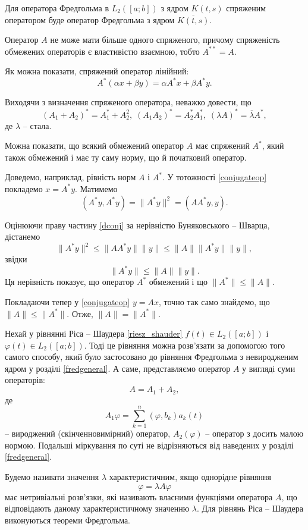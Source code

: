 \documentclass[14pt,twoside]{extreport}
\theoremstyle{mystyle}
\numberwithin{equation}{chapter}
\begin{document}
Для оператора Фредгольма в $L_2([a; b])$ з ядром $K(t, s)$ спряженим оператором буде оператор Фредгольма з ядром $\overline{K(t, s)}$.

Оператор $A$ не може мати більше одного спряженого, причому спряженість обмежених операторів є властивістю взаємною, тобто $A^{**} = A$.

Як можна показати, спряжений оператор лінійний:
\[
A^{*}(\alpha x + \beta y) = \alpha A^{*}x + \beta A^{*} y.
\]

Виходячи з визначення спряженого оператора, неважко довести, що
\[
(A_1 + A_2)^{*} = A_1^{*} + A_2^{2}, \; (A_1A_2)^{*} = A_2^{*}A_1^{*}, \; (\lambda A)^{*} = \overline{\lambda} A^{*},
\]
де $\lambda$ -- стала.

Можна показати, що всякий обмежений оператор $A$ має спряжений $A^{*}$, який також обмежений і має ту саму норму, що й початковий оператор.

Доведемо, наприклад, рівність норм $A$ і $A^{*}$. У тотожності \eqref{conjugateop} покладемо $x=A^{*}y$. Матимемо
\begin{equation}\label{dconj}
(A^*y, A^*y) = \|A^* y\|^2 = (AA^*y, y).
\end{equation}

Оцінюючи праву частину \eqref{dconj} за нерівністю Буняковського -- Шварца, дістанемо
\[
\|A^*y\|^2 \leqslant \|AA^*y\| \|y\| \leqslant \|A\| \|A^*y\| \|y\|,
\]
звідки
\[
\|A^*y\| \leqslant \|A\| \|y\|.
\]
Ця нерівність показує, що оператор $A^*$ обмежений і що $\|A^*\| \leqslant \|A\|$.

Покладаючи тепер у \eqref{conjugateop} $y = Ax$, точно так само знайдемо, що $\|A\| \leqslant \|A^*\|$. Отже, $\|A\| = \|A^*\|$.

Нехай у рівнянні Ріса -- Шаудера \eqref{riesz_shauder} $f(t) \in L_2([a; b])$ і $\varphi(t) \in L_2([a; b])$. Тоді це рівняння можна розв'язати за допомогою того самого способу, який було застосовано до рівняння Фредгольма з невиродженим ядром у розділі \ref{fredgeneral}. А саме, представляємо оператор $A$ у вигляді суми операторів:
\[
A=A_1+A_2,
\]
де
\[
A_1\varphi = \sum_{k=1}^{n} (\varphi, b_k) a_k(t)
\]
-- вироджений (скінченновимірний) оператор, $A_2(\varphi)$ -- оператор з досить малою нормою. Подальші міркування по суті не відрізняються від наведених у розділі \ref{fredgeneral}.

Будемо називати значення $\lambda$ характеристичним, якщо однорідне рівняння
\[
\varphi = \lambda A \varphi
\]
має нетривіальні розв'язки, які називають власними функціями оператора $A$, що відповідають даному характеристичному значенню $\lambda$. Для рівнянь Ріса -- Шаудера виконуються теореми Фредгольма.
\end{document}
